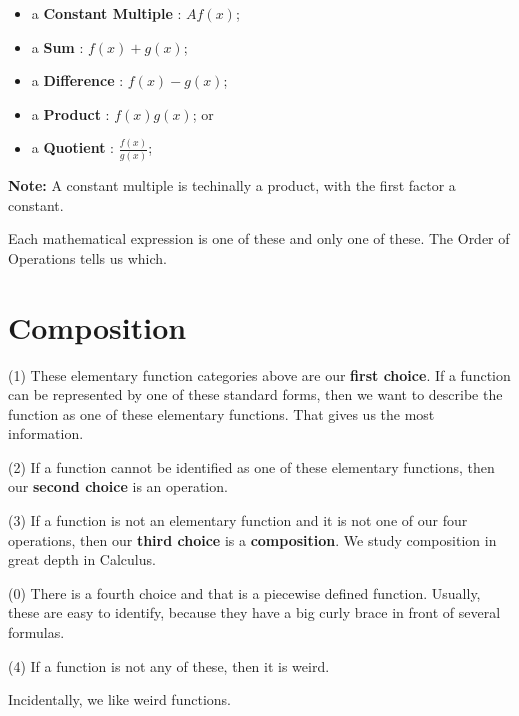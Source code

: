 \documentclass{ximera}
\begin{document}
\begin{itemize}
	\item a \textbf{Constant Multiple} : $A f(x)$;
	\item a \textbf{Sum} : $f(x) + g(x)$;
	\item a \textbf{Difference} : $f(x) - g(x)$;
	\item a \textbf{Product} : $f(x) g(x)$; or 
	\item a \textbf{Quotient} : $\frac{f(x)}{g(x)}$;
\end{itemize}

\textbf{Note:} A constant multiple is techinally a product, with the first factor a constant.

Each mathematical expression is one of these and only one of these.  The Order of Operations tells us which.













\section*{Composition}


(1) These elementary function categories above are our \textbf{first choice}.  If a function can be represented by one of these standard forms, then we want to describe the function as one of these elementary functions.  That gives us the most information. 


(2) If a function cannot be identified as one of these elementary functions, then our \textbf{second choice} is an operation. 


(3) If a function is not an elementary function and it is not one of our four operations, then our \textbf{third choice} is a \textbf{\textcolor{purple!85!blue}{composition}}.  We study composition in great depth in Calculus. 

(0) There is a fourth choice and that is a piecewise defined function.  Usually, these are easy to identify, because they have a big curly brace in front of several formulas. 

(4) If a function is not any of these, then it is weird.

Incidentally, we like weird functions.
\end{document}
